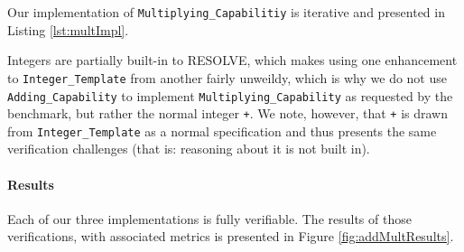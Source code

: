 

Our implementation of \texttt{Multiplying\_Capabilitiy} is iterative and presented in Listing \ref{lst:multImpl}.



\begin{sloppypar}
Integers are partially built-in to RESOLVE, which makes using one enhancement to \texttt{Integer\_Template} from another fairly unweildy, which is why we do not use \texttt{Adding\_Capability} to implement \texttt{Multiplying\_Capability} as requested by the benchmark, but rather the normal integer \texttt{+}.  We note, however, that \texttt{+} is drawn from \texttt{Integer\_Template} as a normal specification and thus presents the same verification challenges (that is: reasoning about it is not built in).
\end{sloppypar}

\paragraph{Results}Each of our three implementations is fully verifiable.  The results of those verifications, with associated metrics is presented in Figure \ref{fig:addMultResults}.

